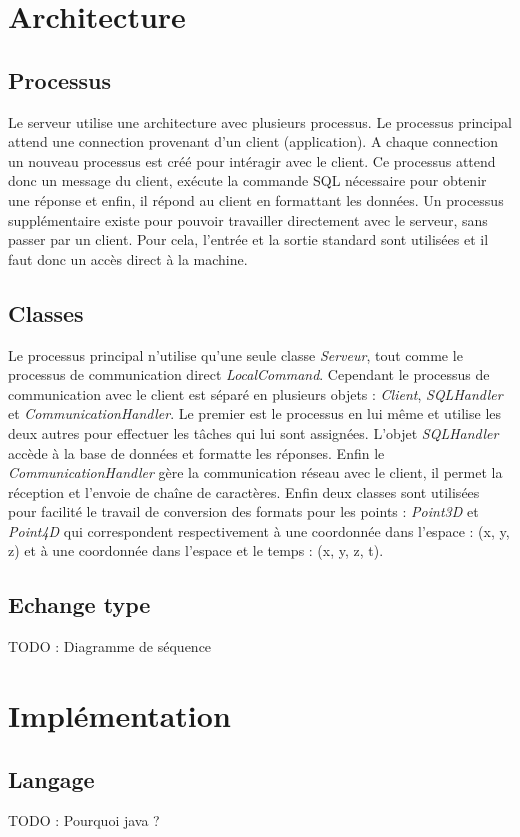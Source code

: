 \documentclass[a4paper, 11pt]{report}
\begin{document}
\section{Architecture}
	\subsection{Processus}
		Le serveur utilise une architecture avec plusieurs processus. Le processus principal attend une connection provenant d'un client (application).
		A chaque connection un nouveau processus est créé pour intéragir avec le client. Ce processus attend donc un message du client, exécute la commande
		SQL nécessaire pour obtenir une réponse et enfin, il répond au client en formattant les données. Un processus supplémentaire existe pour pouvoir
		travailler directement avec le serveur, sans passer par un client. Pour cela, l'entrée et la sortie standard sont utilisées et il faut donc un accès direct à la machine.
	\subsection{Classes}
		Le processus principal n'utilise qu'une seule classe \emph{Serveur}, tout comme le processus de communication direct \emph{LocalCommand}.
		Cependant le processus de communication avec le client est séparé en plusieurs objets : \emph{Client}, \emph{SQLHandler} et \emph{CommunicationHandler}. 
		Le premier est le processus en lui même et utilise les deux autres pour effectuer les tâches qui lui sont assignées. L'objet \emph{SQLHandler} accède à la base de données et formatte les réponses.
		Enfin le \emph{CommunicationHandler} gère la communication réseau avec le client, il permet la réception et l'envoie de chaîne de caractères.
		Enfin deux classes sont utilisées pour facilité le travail de conversion des formats pour les points : \emph{Point3D} et \emph{Point4D} qui correspondent respectivement à une coordonnée dans l'espace : (x, y, z)
		et à une coordonnée dans l'espace et le temps : (x, y, z, t).
	\subsection{Echange type}
		TODO : Diagramme de séquence
\section{Implémentation}
	\subsection{Langage}
		TODO : Pourquoi java ?
\end{document}
